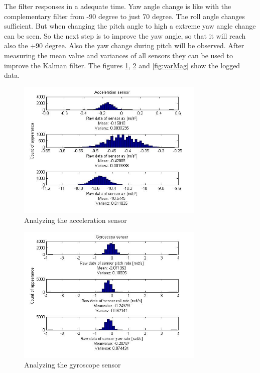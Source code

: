 The filter responses in a adequate time. Yaw angle change is like with the complementary filter from -90 degree to just 70 degree. The roll angle changes sufficient. But when changing the pitch angle to high a extreme yaw angle change can be seen. So the next step is to improve the yaw angle, so that it will reach also the +90 degree. Also the yaw change during pitch will be observed. After measuring the mean value and variances of all sensors they can be used to improve the Kalman filter. The figures \ref{fig:varAcc}, \ref{fig:varGyro} and \ref{fig:varMag} show the logged data.
\begin{figure}[H]
	\centering\includegraphics[width=0.8\textwidth]{fig/Res_Kal_Comp/varAcc3}
	\caption{Analyzing the acceleration sensor}
	\label{fig:varAcc}
\end{figure}
\begin{figure}[H]
	\centering\includegraphics[width=0.8\textwidth]{fig/Res_Kal_Comp/varGyro3}
	\caption{Analyzing the gyroscope sensor}
	\label{fig:varGyro}
\end{figure}
